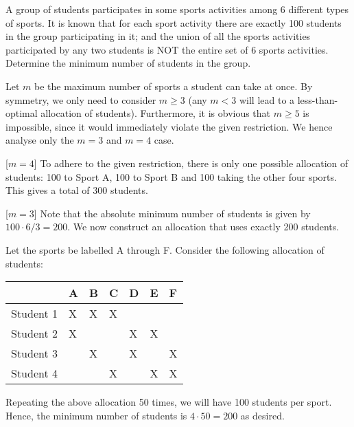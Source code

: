 \begin{question}[200]\label{Q::2022-O-1-22}
    A group of students participates in some sports activities among 6 different types of sports. It is known that for each sport activity there are exactly 100 students in the group participating in it; and the union of all the sports activities participated by any two students is NOT the entire set of 6 sports activities. Determine the minimum number of students in the group.
\end{question}
\begin{solution*}
    Let $m$ be the maximum number of sports a student can take at once. By symmetry, we only need to consider $m \geq 3$ (any $m < 3$ will lead to a less-than-optimal allocation of students). Furthermore, it is obvious that $m \geq 5$ is impossible, since it would immediately violate the given restriction. We hence analyse only the $m = 3$ and $m = 4$ case.

    [$m = 4$] To adhere to the given restriction, there is only one possible allocation of students: 100 to Sport A, 100 to Sport B and 100 taking the other four sports. This gives a total of 300 students.

    [$m = 3$] Note that the absolute minimum number of students is given by $100 \cdot 6 / 3 = 200$. We now construct an allocation that uses exactly 200 students.

    Let the sports be labelled A through F. Consider the following allocation of students:
    \begin{table}[H]
        \centering
        \begin{tabular}{|l|l|l|l|l|l|l|}
        \hline
        & A & B & C & D & E & F \\ \hline
        Student 1 & X & X & X &  &  &  \\ \hline
        Student 2 & X &  &  & X & X &  \\ \hline
        Student 3 &  & X &  & X &  & X \\ \hline
        Student 4 &  &  & X &  & X & X \\ \hline
        \end{tabular}
    \end{table}
    Repeating the above allocation 50 times, we will have 100 students per sport. Hence, the minimum number of students is $4 \cdot 50 = 200$ as desired.
\end{solution*}

